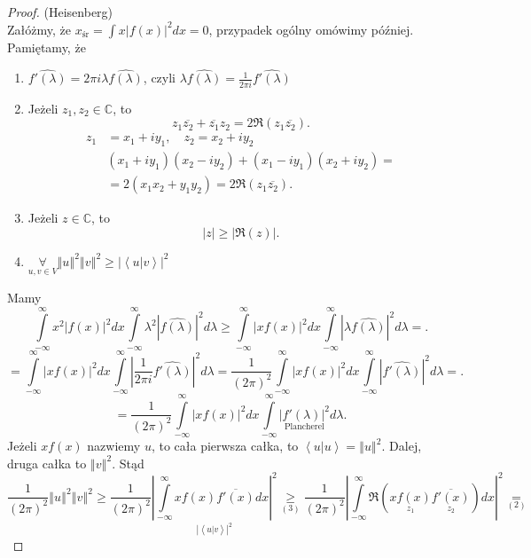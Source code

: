 \documentclass[../main.tex]{subfiles}
\begin{document}
\begin{proof}
    (Heisenberg)\\
    Załóżmy, że $x_{\text{śr}} = \int x \left| f(x) \right|^2 dx = 0$, przypadek ogólny omówimy później. Pamiętamy, że
    \begin{enumerate}
        \item $\widehat{f'(\lambda)} = 2\pi i \lambda \widehat{f(\lambda)}$, czyli $\lambda \widehat{f(\lambda)} = \frac{1}{2\pi i }\widehat{f'(\lambda)}$
        \item Jeżeli $z_1, z_2\in \mathbb{C}$, to
             \[
                 z_1\overline{z_2} + \overline{z_1}z_2 = 2 \Re(z_1\overline{z_2})
            .\]
        \begin{align*}
            z_1 &= x_1 + iy_1,\quad z_2 = x_2 + iy_2\\
            &(x_1 + iy_1)(x_2 - iy_2) + (x_1 - iy_1)(x_2 + iy_2) = \\
            &= 2(x_1x_2 + y_1y_2) = 2 \Re (z_1\overline{z_2})
        .\end{align*}
    \item Jeżeli $z\in \mathbb{C}$, to
         \[
             |z| \ge \left| \Re(z) \right|
        .\]
\item $\underset{u,v\in V}{\forall} \left\Vert u \right\Vert ^2 \left\Vert v \right\Vert ^2 \ge \left| \left<u|v \right> \right| ^2$
    \end{enumerate}
    Mamy
    \[
        \int\limits_{-\infty}^{\infty} x^2 \left| f(x) \right| ^2 dx \int\limits_{-\infty}^{\infty} \lambda^2 \left| \widehat{f(\lambda)} \right| ^2 d\lambda \ge \int\limits_{-\infty}^{\infty} \left| xf(x) \right| ^2 dx \int\limits_{-\infty}^{\infty} \left| \lambda \widehat{f(\lambda)} \right| ^2 d\lambda=
    .\]
\[
    = \int\limits_{-\infty}^{\infty} \left| xf(x) \right| ^2 dx \int\limits_{-\infty}^{\infty} \left| \frac{1}{2\pi i}\widehat{f'(\lambda)} \right| ^2 d\lambda = \frac{1}{(2\pi)^2}\int\limits_{-\infty}^{\infty} \left| xf(x) \right| ^2 dx \int\limits_{-\infty}^{\infty} \left| \widehat{f'(\lambda)} \right| ^2 d\lambda=
.\]
\[
    =\frac{1}{(2\pi)^2}\int\limits_{-\infty}^{\infty} \left| xf(x) \right| ^2dx \int\limits_{-\infty}^{\infty} \underset{\text{Plancherel}}{\left| f'(\lambda) \right| ^2} d\lambda
.\]
Jeżeli $xf(x)$ nazwiemy $u$, to cała pierwsza całka, to $\left<u|u \right> = \left\Vert u \right\Vert ^2$. Dalej, druga całka to $\left\Vert v \right\Vert ^2$. Stąd
\[
    \frac{1}{(2\pi)^2}\left\Vert u \right\Vert ^2 \left\Vert v \right\Vert ^2 \ge \frac{1}{(2\pi)^2}\underset{\left| \left<u|v \right> \right|^2 }{\left| \int\limits_{-\infty}^{\infty} x f(x) \overline{f'(x)}dx  \right| ^2} \underset{(3)}{\ge} \frac{1}{(2\pi)^2}\left| \int\limits_{-\infty}^{\infty} \Re \left( \underset{z_1}{xf(x)}\underset{z_2}{\overline{f'(x)}} \right) dx  \right| ^2 \underset{(2)}{=}
\]
\end{proof}
\end{document}
